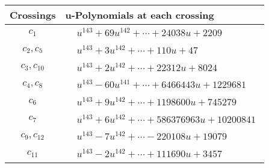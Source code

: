 \documentclass[1p]{elsarticle_modified}
\theoremstyle{definition}
\begin{document}
\begin{tabular}{m{50pt}|m{274pt}}
Crossings & \hspace{64pt}u-Polynomials at each crossing \\
\hline $$\begin{aligned}c_{1}\end{aligned}$$&$\begin{aligned}
&u^{143}+69 u^{142}+\cdots+24038 u+2209
\end{aligned}$\\
\hline $$\begin{aligned}c_{2},c_{5}\end{aligned}$$&$\begin{aligned}
&u^{143}+3 u^{142}+\cdots+110 u+47
\end{aligned}$\\
\hline $$\begin{aligned}c_{3},c_{10}\end{aligned}$$&$\begin{aligned}
&u^{143}+2 u^{142}+\cdots+22312 u+8024
\end{aligned}$\\
\hline $$\begin{aligned}c_{4},c_{8}\end{aligned}$$&$\begin{aligned}
&u^{143}-60 u^{141}+\cdots+6466443 u+1229681
\end{aligned}$\\
\hline $$\begin{aligned}c_{6}\end{aligned}$$&$\begin{aligned}
&u^{143}+9 u^{142}+\cdots+1198600 u+745279
\end{aligned}$\\
\hline $$\begin{aligned}c_{7}\end{aligned}$$&$\begin{aligned}
&u^{143}+6 u^{142}+\cdots+586376963 u+10200841
\end{aligned}$\\
\hline $$\begin{aligned}c_{9},c_{12}\end{aligned}$$&$\begin{aligned}
&u^{143}-7 u^{142}+\cdots-220108 u+19079
\end{aligned}$\\
\hline $$\begin{aligned}c_{11}\end{aligned}$$&$\begin{aligned}
&u^{143}-2 u^{142}+\cdots+111690 u+3457
\end{aligned}$\\
\hline
\end{tabular}\\~\\
\end{document}
